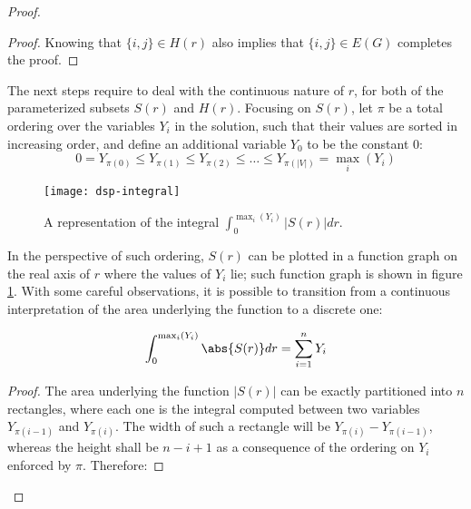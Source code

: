 \begin{proof}
\begin{proof}
        Knowing that $\{i, j\} \in H(r)$ also implies that $\{i, j\} \in E(G)$ completes the proof.
    \end{proof}

    The next steps require to deal with the continuous nature of $r$, for both of the parameterized subsets $S(r)$ and $H(r)$. Focusing on $S(r)$, let $\pi$ be a total ordering over the variables $Y_i$ in the solution, such that their values are sorted in increasing order, and define an additional variable $Y_0$ to be the constant 0:
    \[
        0 = Y_{\pi(0)} \leq Y_{\pi(1)} \leq Y_{\pi(2)} \leq \dots \leq Y_{\pi(|V|)} = \max_i(Y_i)
    \]

    \begin{figure}[ht]
        \centering
        \texttt{[image: dsp-integral]}
        \caption{A representation of the integral $\int_0^{\max_i(Y_i)} |S(r)| dr$.}
        \label{fig:dsp-integral}
    \end{figure}

    In the perspective of such ordering, $S(r)$ can be plotted in a function graph on the real axis of $r$ where the values of $Y_i$ lie; such function graph is shown in figure \ref{fig:dsp-integral}. With some careful observations, it is possible to transition from a continuous interpretation of the area underlying the function to a discrete one:

    
    \begin{claim}\label{cl:dsp-3}
        \[
            \int_0^{\max_i(Y_i)} \abs{S(r)} dr = \sum_{i = 1}^n Y_i
        \]
    \end{claim}

    \begin{proof}
        The area underlying the function $|S(r)|$ can be exactly partitioned into $n$ rectangles, where each one is the integral computed between two variables $Y_{\pi(i - 1)}$ and $Y_{\pi(i)}$. The width of such a rectangle will be $Y_{\pi(i)} - Y_{\pi(i - 1)}$, whereas the height shall be $n - i + 1$ as a consequence of the ordering on $Y_i$ enforced by $\pi$. Therefore:
        

\end{proof}
\end{proof}
